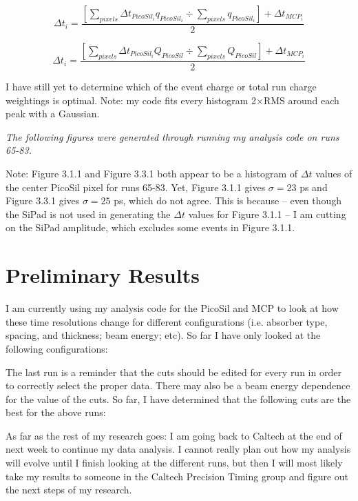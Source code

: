 \documentclass[12pt]{article}
\begin{document}
\[
\Delta t_i = 
\dfrac{
\left[ \sum_{pixels} \Delta t_{PicoSil_i} q_{PicoSil_i}
\div
\sum_{pixels} q_{PicoSil_i}
\right]
+ \Delta t_{MCP_i} 
} {2}
\]

\[
\Delta t_i = 
\dfrac{
\left[ \sum_{pixels} \Delta t_{PicoSil_i} Q_{PicoSil}
\div
\sum_{pixels} Q_{PicoSil}
\right]
+ \Delta t_{MCP_i} 
} {2}
\]

I have still yet to determine which of the event charge or total run charge weightings is optimal. Note: my code fits every histogram 2$\times$RMS around each peak with a Gaussian.

\textit{ The following figures were generated through running my analysis code on runs 65-83. }


Note: Figure 3.1.1 and Figure 3.3.1 both appear to be a histogram of $\Delta t$ values of the center PicoSil pixel for runs 65-83. Yet, Figure 3.1.1 gives $\sigma=23$ ps and Figure 3.3.1 gives $\sigma=25$ ps, which do not agree. This is because – even though the SiPad is not used in generating the $\Delta t$ values for Figure 3.1.1 – I am cutting on the SiPad amplitude, which excludes some events in Figure 3.1.1.

\setcounter{section}{3}
\section{Preliminary Results}
I am currently using my analysis code for the PicoSil and MCP to look at how these time resolutions change for different configurations (i.e. absorber type, spacing, and thickness; beam energy; etc). So far I have only looked at the following configurations:


The last run is a reminder that the cuts should be edited for every run in order to correctly select the proper data. There may also be a beam energy dependence for the value of the cuts. So far, I have determined that the following cuts are the best for the above runs:


As far as the rest of my research goes: I am going back to Caltech at the end of next week to continue my data analysis. I cannot really plan out how my analysis will evolve until I finish looking at the different runs, but then I will most likely take my results to someone in the Caltech Precision Timing group and figure out the next steps of my research. 
\end{document}
